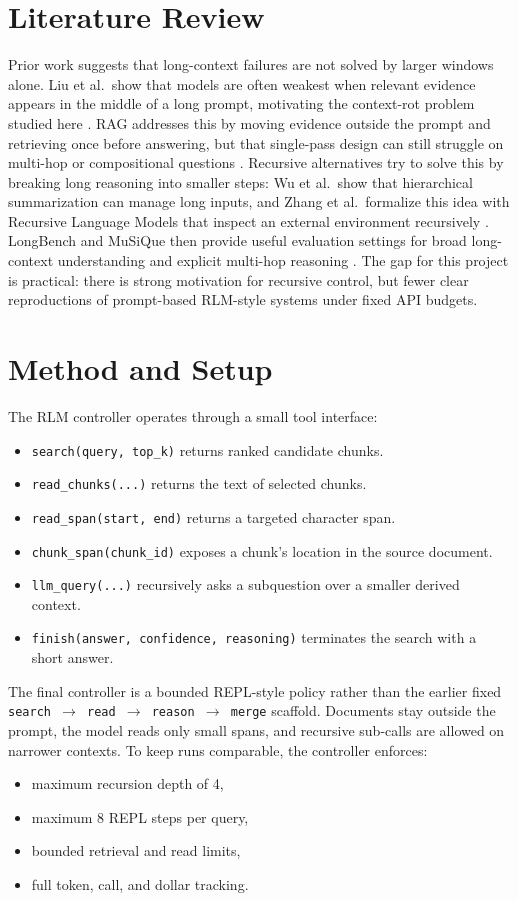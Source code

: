 \documentclass[11pt]{article}
\begin{document}
\section{Literature Review}
Prior work suggests that long-context failures are not solved by larger windows alone. Liu et al.\ show that models are often weakest when relevant evidence appears in the middle of a long prompt, motivating the context-rot problem studied here \cite{liu2024lost}. RAG addresses this by moving evidence outside the prompt and retrieving once before answering, but that single-pass design can still struggle on multi-hop or compositional questions \cite{lewis2020rag}. Recursive alternatives try to solve this by breaking long reasoning into smaller steps: Wu et al.\ show that hierarchical summarization can manage long inputs, and Zhang et al.\ formalize this idea with Recursive Language Models that inspect an external environment recursively \cite{wu2021books, zhang2025rlm}. LongBench and MuSiQue then provide useful evaluation settings for broad long-context understanding and explicit multi-hop reasoning \cite{bai2023longbench, trivedi2022musique}. The gap for this project is practical: there is strong motivation for recursive control, but fewer clear reproductions of prompt-based RLM-style systems under fixed API budgets.

\section{Method and Setup}
The RLM controller operates through a small tool interface:
\begin{itemize}
  \item \texttt{search(query, top\_k)} returns ranked candidate chunks.
  \item \texttt{read\_chunks(...)} returns the text of selected chunks.
  \item \texttt{read\_span(start, end)} returns a targeted character span.
  \item \texttt{chunk\_span(chunk\_id)} exposes a chunk's location in the source document.
  \item \texttt{llm\_query(...)} recursively asks a subquestion over a smaller derived context.
  \item \texttt{finish(answer, confidence, reasoning)} terminates the search with a short answer.
\end{itemize}

The final controller is a bounded REPL-style policy rather than the earlier fixed \texttt{search $\rightarrow$ read $\rightarrow$ reason $\rightarrow$ merge} scaffold. Documents stay outside the prompt, the model reads only small spans, and recursive sub-calls are allowed on narrower contexts. To keep runs comparable, the controller enforces:
\begin{itemize}
  \item maximum recursion depth of 4,
  \item maximum 8 REPL steps per query,
  \item bounded retrieval and read limits,
  \item full token, call, and dollar tracking.
\end{itemize}
\end{document}
